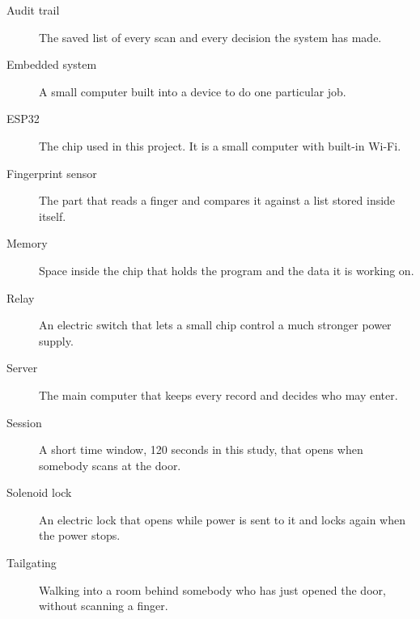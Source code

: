 \begin{description}
  \item[Audit trail] The saved list of every scan and every decision the system
        has made.
  \item[Embedded system] A small computer built into a device to do one
        particular job.
  \item[ESP32] The chip used in this project. It is a small computer with
        built-in Wi-Fi.
  \item[Fingerprint sensor] The part that reads a finger and compares it against
        a list stored inside itself.
  \item[Memory] Space inside the chip that holds the program and the data it is
        working on.
  \item[Relay] An electric switch that lets a small chip control a much stronger
        power supply.
  \item[Server] The main computer that keeps every record and decides who may
        enter.
  \item[Session] A short time window, 120 seconds in this study, that opens when
        somebody scans at the door.
  \item[Solenoid lock] An electric lock that opens while power is sent to it and
        locks again when the power stops.
  \item[Tailgating] Walking into a room behind somebody who has just opened the
        door, without scanning a finger.
\end{description}
